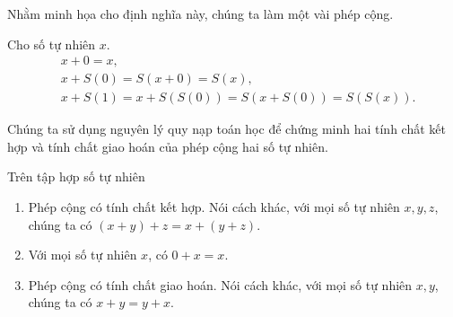 Nhằm minh họa cho định nghĩa này, chúng ta làm một vài phép cộng.
\begin{example}
    Cho số tự nhiên $x$.
    \begin{align*}
         & x + 0 = x,                                      \\
         & x + S(0) = S(x + 0) = S(x),                     \\
         & x + S(1) = x + S(S(0)) = S(x + S(0)) = S(S(x)).
    \end{align*}
\end{example}

Chúng ta sử dụng nguyên lý quy nạp toán học để chứng minh hai tính chất kết hợp và tính chất giao hoán của phép cộng hai số tự nhiên.
\begin{theorem}\label{theorem:property-of-natural-numbers-addition}
    Trên tập hợp số tự nhiên
    \begin{enumerate}[label={(\roman*)}]
        \item Phép cộng có tính chất kết hợp. Nói cách khác, với mọi số tự nhiên $x, y, z$, chúng ta có $(x + y) + z = x + (y + z)$.
        \item Với mọi số tự nhiên $x$, có $0 + x = x$.
        \item Phép cộng có tính chất giao hoán.  Nói cách khác, với mọi số tự nhiên $x, y$, chúng ta có $x + y = y + x$.
    \end{enumerate}
\end{theorem}

